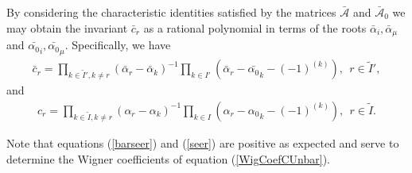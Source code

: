 \documentclass[12pt]{article}
\begin{document}
By considering the characteristic identities satisfied by the matrices $\bar{\mathcal{A}}$ and $\bar{\mathcal{A}}_0$ we may obtain the invariant $\bar{c}_r$ as a rational polynomial in terms of the roots $\bar{\alpha}_i,\bar{\alpha}_\mu$ and $\bar{\alpha_0}_i,\bar{\alpha_0}_\mu$. Specifically, we have \cite{GIW1}
\begin{align}
\bar{c}_r = \prod_{k\in \tilde{I}',k\neq r} \left(\bar{\alpha}_r - \bar{\alpha}_k\right)^{-1}\prod_{k\in
I'} \left(\bar{\alpha}_r - \bar{\alpha_0}_k - (-1)^{(k)}\right),\ \ r\in \tilde{I}',
\label{barseer}
\end{align}
and
\begin{align}
c_r = \prod_{k\in \tilde{I},k\neq r} \left(\alpha_r - \alpha_k \right)^{-1}\prod_{k\in
I} \left(\alpha_r - {\alpha_0}_k - (-1)^{(k)}\right),\ \ r\in \tilde{I} .
\label{seer}
\end{align}

Note that equations (\ref{barseer}) and (\ref{seer}) are positive as expected and serve to determine the Wigner coefficients of equation (\ref{WigCoefCUnbar}).
\end{document}
